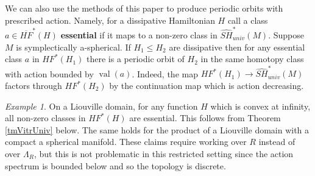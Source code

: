 \documentclass[11pt]{amsart}
\DeclareMathOperator{\val}{val}
\theoremstyle{definition}
\theoremstyle{remark}
\newtheorem{ex}[tm]{Example}
\begin{document}
We can also use the methods of this paper to produce periodic orbits with prescribed action. Namely, for a dissipative Hamiltonian $H$ call a class $a\in \overline{HF}^*(H)$ \textbf{essential} if it maps to a non-zero class in $\widehat{SH}_{univ}^*(M)$. Suppose $M$ is symplectically a-spherical. If $H_1\leq H_2$ are dissipative then for any essential class $a$ in $HF^*(H_1)$ there is a periodic orbit of $H_2$  in the same homotopy class with action bounded by $\val(a)$. Indeed, the map $HF^*(H_1)\to \widehat{SH}^*_{univ}(M)$  factors through $HF^*(H_2)$ by the continuation map which is action decreasing.

\begin{ex}
On a Liouville domain, for any function $H$ which is convex at infinity, all non-zero classes in $HF^*(H)$ are essential. This follows from Theorem \ref{tmVitrUniv} below. The same holds for the product of a Liouville domain with a compact a spherical manifold. These claims require working over $R$ instead of over $\Lambda_R$, but this is not problematic in this restricted setting since the action spectrum is bounded below and so the topology is discrete.
\end{ex}
\end{document}
